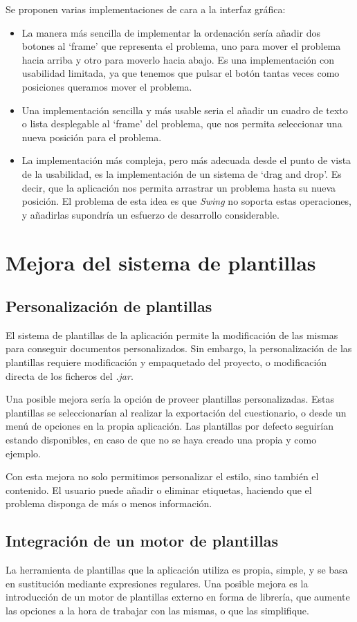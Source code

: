 Se proponen varias implementaciones de cara a la interfaz gráfica:
\begin{itemize}
	\item La manera más sencilla de implementar la ordenación sería añadir dos botones al `frame' que representa el problema, uno para mover el problema hacia arriba y otro para moverlo hacia abajo.
	Es una implementación con usabilidad limitada, ya que tenemos que pulsar el botón tantas veces como posiciones queramos mover el problema.
	\item Una implementación sencilla y más usable seria el añadir un cuadro de texto o lista desplegable al `frame' del problema, que nos permita seleccionar una nueva posición para el problema.
	\item La implementación más compleja, pero más adecuada desde el punto de vista de la usabilidad, es la implementación de un sistema de `drag and drop'.
	Es decir, que la aplicación nos permita arrastrar un problema hasta su nueva posición.
	El problema de esta idea es que \emph{Swing} no soporta estas operaciones, y añadirlas supondría un esfuerzo de desarrollo considerable.
\end{itemize}

\section{Mejora del sistema de plantillas}
\subsection{Personalización de plantillas}
El sistema de plantillas de la aplicación permite la modificación de las mismas para conseguir documentos personalizados.
Sin embargo, la personalización de las plantillas requiere modificación y empaquetado del proyecto, o modificación directa de los ficheros del \emph{.jar}.

Una posible mejora sería la opción de proveer plantillas personalizadas.
Estas plantillas se seleccionarían al realizar la exportación del cuestionario, o desde un menú de opciones en la propia aplicación.
Las plantillas por defecto seguirían estando disponibles, en caso de que no se haya creado una propia y como ejemplo.

Con esta mejora no solo permitimos personalizar el estilo, sino también el contenido.
El usuario puede añadir o eliminar etiquetas, haciendo que el problema disponga de más o menos información.

\subsection{Integración de un motor de plantillas}
La herramienta de plantillas que la aplicación utiliza es propia, simple, y se basa en sustitución mediante expresiones regulares.
Una posible mejora es la introducción de un motor de plantillas externo en forma de librería, que aumente las opciones a la hora de trabajar con las mismas, o que las simplifique.

